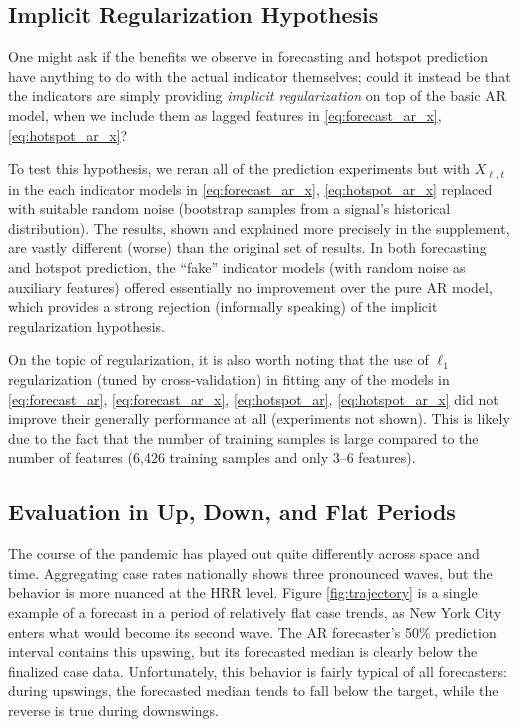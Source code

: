 \documentclass[9pt,twocolumn,twoside,lineno]{pnas-new}
\begin{document}
\subsection{Implicit Regularization Hypothesis}

One might ask if the benefits we observe in forecasting and hotspot
prediction have anything to do with the actual indicator themselves; could it
instead be that the indicators are simply providing \textit{implicit
  regularization} on top of  the basic AR model, when we include them as lagged
features in \eqref{eq:forecast_ar_x}, \eqref{eq:hotspot_ar_x}?   

To test this hypothesis, we reran all of the prediction experiments but with
$X_{\ell,t}$ in the each indicator models in \eqref{eq:forecast_ar_x},
\eqref{eq:hotspot_ar_x} replaced with suitable random noise (bootstrap samples
from a signal's historical distribution).  The results, shown and explained more
precisely in the supplement, are vastly different (worse) than the original set
of results.  In both forecasting and hotspot prediction, the ``fake'' indicator
models (with random noise as auxiliary features) offered essentially no
improvement over the pure AR model, which provides a strong rejection
(informally speaking) of the implicit regularization hypothesis.     

On the topic of regularization, it is also worth noting that the use of 
$\ell_1$ regularization (tuned by cross-validation) in fitting any of the models
in \eqref{eq:forecast_ar}, \eqref{eq:forecast_ar_x}, \eqref{eq:hotspot_ar}, 
\eqref{eq:hotspot_ar_x} did not improve their generally performance at all
(experiments not shown).  This is likely due to the fact that the number of
training samples is large compared to the number of features (6,426 training
samples and only 3--6 features).   


\subsection{Evaluation in Up, Down, and Flat Periods}

The course of the pandemic has played out quite differently across space and
time. Aggregating case rates nationally shows three pronounced waves, but the
behavior is more nuanced at the HRR level.  Figure \ref{fig:trajectory} is a
single example of a forecast in a period of relatively flat case trends, as New
York City enters what would become its second wave. The AR forecaster's 50\%
prediction interval contains this upswing, but its forecasted median is clearly
below the finalized case data.  Unfortunately, this behavior is fairly typical
of all forecasters: during upswings, the forecasted median tends to fall below 
the target, while the reverse is true during downswings.
\end{document}
